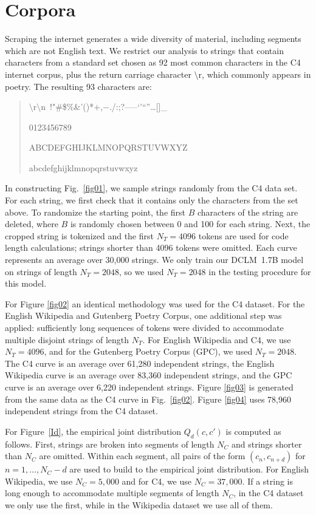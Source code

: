 \documentclass[aps,twocolumn,floats,prx]{revtex4}
\begin{document}
\appendix

\section{Corpora}
\label{app:corpora}

Scraping the internet generates a wide diversity of material, including segments which are not English text.  We restrict our analysis to strings that contain characters from a standard set chosen as 92 most common characters in the C4 internet corpus, plus the return carriage character $\setminus$r, which commonly appears in poetry. The resulting 93 characters are: 
\begin{quote}
$\setminus$r$\setminus$n\ !"\#\$\%\&'()*$+$,$-$./:;?–—‘’“”…[]\_

0123456789

ABCDEFGHIJKLMNOPQRSTUVWXYZ

abcdefghijklmnopqrstuvwxyz
\end{quote}

In constructing Fig.~\ref{fig01}, we sample strings randomly from the C4 data set. For each string, we first check that it contains only the characters from the set above.  
To randomize the starting point, the first $B$ characters of the string are deleted, where $B$ is randomly chosen between 0 and 100 for each string.  Next, the cropped string is  tokenized and the first $N_T=4096$ tokens are used for code length calculations; strings  shorter than 4096 tokens were omitted. Each curve represents an average over 30,000  strings. We only train our DCLM~1.7B model on strings of length $N_T=2048$, so we used $N_T=2048$ in the testing procedure for this model. 

For Figure \ref{fig02} an identical methodology was used for the C4 dataset. For the English Wikipedia and Gutenberg Poetry Corpus, one additional step was applied: sufficiently long  sequences of tokens were divided to accommodate multiple disjoint strings of length $N_T$. For English Wikipedia and C4, we use $N_T=4096$, and for the Gutenberg Poetry Corpus (GPC), we used $N_T=2048$. The C4 curve is an average over 61,280 independent strings, the English Wikipedia curve is an average over 83,360 independent strings, and the GPC curve is an average over 6,220 independent strings. Figure \ref{fig03} is generated from the same data as the C4 curve in Fig.~\ref{fig02}. Figure \ref{fig04} uses 78,960 independent strings from the C4 dataset.

For Figure~\ref{Id}, the empirical joint distribution $Q_d(c,c')$ is computed as follows. First, strings are broken into segments of length $N_C$ and strings shorter than $N_C$ are omitted. Within each segment, all pairs of the form $(c_{n},c_{n+d})$ for $n=1,\dots,N_C-d$ are used to build to the empirical joint distribution. For English Wikipedia, we use $N_C=5,000$ and for C4, we use $N_C=37,000$. If a string is long enough to accommodate multiple segments of length $N_C$, in the C4 dataset we only use the first, while in the Wikipedia dataset we use all of them. 
\end{document}
